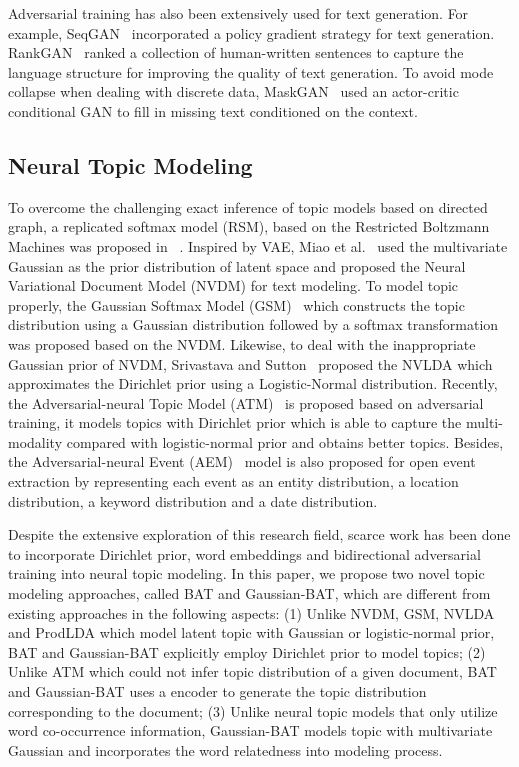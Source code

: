 \documentclass[11pt,a4paper]{article}
\begin{document}
Adversarial training has also been extensively used for text generation. For example, SeqGAN~\cite{yu2017seqgan} incorporated a policy gradient strategy for text generation. RankGAN~\cite{lin2017adversarial} ranked a collection of human-written sentences to capture the language structure for improving the quality of text generation. To avoid mode collapse when dealing with discrete data, MaskGAN~\cite{fedus2018maskgan} used an actor-critic conditional GAN to fill in missing text conditioned on the context.

\subsection{Neural Topic Modeling}

To overcome the challenging exact inference of topic models based on  directed graph, a replicated softmax model (RSM), based on the Restricted Boltzmann Machines was proposed in ~\cite{hinton2009replicated}. Inspired by VAE, Miao et al.~ used the multivariate Gaussian as the prior distribution of latent space and proposed the Neural Variational Document Model (NVDM) for text modeling. {\color{black}To model topic properly, the Gaussian Softmax Model (GSM)~\cite{miao2017discovering} which constructs the topic distribution using a Gaussian distribution followed by a softmax transformation was proposed based on the NVDM.} Likewise, to deal with the inappropriate Gaussian prior of NVDM, Srivastava and Sutton~ proposed the NVLDA which approximates the Dirichlet prior using a Logistic-Normal distribution. {\color{black} Recently, the Adversarial-neural Topic Model (ATM)~\cite{wang2019atm} is proposed based on adversarial training, it models topics with Dirichlet prior which is able to capture the multi-modality compared with logistic-normal prior and obtains better topics. Besides, the Adversarial-neural Event (AEM)~\cite{wang-etal-2019-open} model is also proposed for open event extraction by representing each event as an entity distribution, a location distribution, a keyword distribution and a date distribution.}

{\color{black}
Despite the extensive exploration of this research field, scarce work has been done to incorporate Dirichlet prior,  word embeddings and bidirectional adversarial training into neural topic modeling. In this paper, we propose two novel topic modeling approaches, called BAT and Gaussian-BAT, which are different from existing approaches in the following aspects: (1) Unlike NVDM, GSM, NVLDA and ProdLDA which model latent topic with Gaussian or logistic-normal prior, BAT and Gaussian-BAT explicitly employ Dirichlet prior to model topics; {\color{black}(2) Unlike ATM which could not infer topic distribution of a given document, BAT and Gaussian-BAT uses a encoder to generate the topic distribution corresponding to the document;} (3) Unlike neural topic models that only utilize word co-occurrence information, Gaussian-BAT models topic with multivariate Gaussian and incorporates the word relatedness into modeling process.
}
\end{document}
